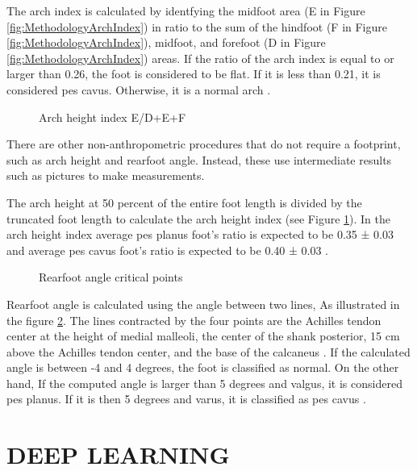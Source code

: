 The arch index is calculated by identfying the midfoot area (E in Figure \ref{fig:MethodologyArchIndex}) in ratio to the sum of the hindfoot (F in Figure \ref{fig:MethodologyArchIndex}), midfoot, and forefoot (D in Figure \ref{fig:MethodologyArchIndex}) areas. If the ratio of the arch index is equal to or larger than 0.26, the foot is considered to be flat. If it is less than 0.21, it is considered pes cavus. Otherwise, it is a normal arch \cite{igbigbi2005arch}. 

\begin{figure}[htbp]
\centering
{}
\caption{Arch height index E/D+E+F \cite{miller2014effect}}
\label{fig:MethodologyArchHeightIndex}
\end{figure}

There are other non-anthropometric procedures that do not require a footprint, such as arch height and rearfoot angle. Instead, these use intermediate results such as pictures to make measurements.

The arch height at 50 percent of the entire foot length is divided by the truncated foot length to calculate the arch height index (see Figure \ref{fig:MethodologyArchHeightIndex}). In the arch height index average pes planus foot’s ratio is expected to be 0.35 ± 0.03 and average pes cavus foot’s ratio is expected to be 0.40 ± 0.03 \cite{hillstrom2013foot}.

\begin{figure}[htbp]
\centering
{}
\caption{Rearfoot angle critical points \cite{langley2016clinical}}
\label{fig:MethodologyRearfootAngle}
\end{figure}

Rearfoot angle is calculated using the angle between two lines, As illustrated in the figure \ref{fig:MethodologyRearfootAngle}. The lines contracted by the four points are the Achilles tendon center at the height of medial malleoli, the center of the shank posterior, 15 cm above the Achilles tendon center, and the base of the calcaneus \cite{huerta2008relationship}. If the calculated angle is between -4 and 4 degrees, the foot is classified as normal. On the other hand, If the computed angle is larger than 5 degrees and valgus, it is considered pes planus. If it is then 5 degrees and varus, it is classified as pes cavus \cite{jonson1997intraexaminer}.

\section{DEEP LEARNING}

